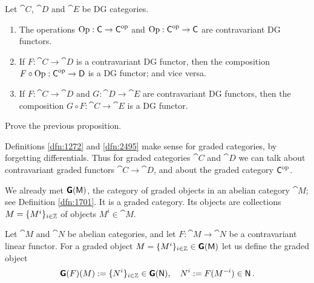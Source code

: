 \begin{prop} \label{prop:2500}
Let $\cat{C}$, $\cat{D}$ and $\cat{E}$ be DG categories.
\begin{enumerate}
\item The operations $\operatorname{Op} : \operatorname{\mathsf{C}} \to \operatorname{\mathsf{C}}^{\mathrm{op}}$
and $\operatorname{Op} : \operatorname{\mathsf{C}}^{\mathrm{op}} \to \operatorname{\mathsf{C}}$
are contravariant DG functors. 

\item If $F : \cat{C} \to \cat{D}$ is a contravariant DG functor, 
then the composition $F \circ \operatorname{Op} : \operatorname{\mathsf{C}}^{\mathrm{op}} \to \operatorname{\mathsf{D}}$
is a DG functor; and vice versa. 

\item If $F : \cat{C} \to \cat{D}$ and $G : \cat{D} \to \cat{E}$
are contravariant DG functors, 
then the composition $G \circ F : \cat{C} \to \cat{E}$
is a  DG functor. 
\end{enumerate}
\end{prop}

\begin{exer}  \label{exer:2495}
Prove the previous proposition. 
\end{exer}

Definitions \ref{dfn:1272} and \ref{dfn:2495} make sense for graded categories, 
by forgetting differentials. Thus for graded categories $\cat{C}$ and 
$\cat{D}$ we can talk about contravariant graded functors
$\cat{C} \to \cat{D}$, and about the graded category $\operatorname{\mathsf{C}}^{\mathrm{op}}$.

We already met $\boldsymbol{\mathsf{G}}(\operatorname{\mathsf{M}})$, the category of graded objects in an
abelian category $\cat{M}$; see Definition \ref{dfn:1701}. It is a 
graded category. 
Its objects are collections $M = \{ M^i \}_{i \in \mathbb{Z}}$ of objects 
$M^i \in \cat{M}$. 

Let $\cat{M}$ and $\cat{N}$ be abelian categories, and let 
$F : \cat{M} \to \cat{N}$ be a contravariant linear functor. 
For a graded object 
$M = \{ M^i \}_{i \in \mathbb{Z}} \in \boldsymbol{\mathsf{G}}(\operatorname{\mathsf{M}})$
let us define the graded object 
\begin{equation} \label{eqn:2496}
\boldsymbol{\mathsf{G}}(F)(M) := \{ N^i \}_{i \in \mathbb{Z}} \in \boldsymbol{\mathsf{G}}(\operatorname{\mathsf{N}}) , \quad 
N^i := F(M^{-i}) \in \operatorname{\mathsf{N}} .
\end{equation}

